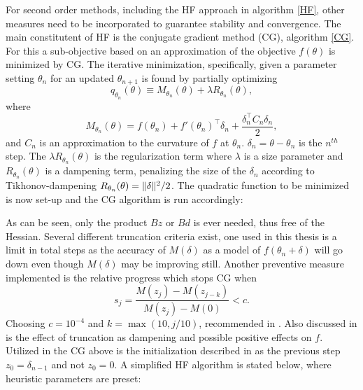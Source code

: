 For second order methods, including the HF approach in algorithm \ref{HF}, other measures need to be incorporated to guarantee stability and convergence. The main constitutent of HF is the conjugate gradient method (CG), algorithm \ref{CG}. For this a sub-objective based on an approximation of the objective $f(\theta)$ is minimized by CG. The iterative minimization, specifically, given a parameter setting $\theta_n$ for an updated $\theta_{n+1}$ is found by partially optimizing \[q_{\theta_n} (\theta) \equiv M_{\theta_n}(\theta) + \lambda R_{\theta_n}(\theta),\] where \[M_{\theta_n}(\theta) = f(\theta_n) + f'(\theta_n)^\intercal \delta_n + \frac{\delta_n^\intercal C_n \delta_n}{2},\] and $C_n$ is an approximation to the curvature of $f$ at $\theta_n$. $\delta_n = \theta - \theta_n$ is the $n^{th}$ step. The $\lambda R_{\theta_n}(\theta)$ is the regularization term where $\lambda$ is a size parameter and $R_{\theta_n}(\theta)$ is a dampening term, penalizing the size of the $\delta_n$ according to Tikhonov-dampening $R_{\theta_n}(\theta) = \lVert\delta\rVert^2/2$. The quadratic function to be minimized is now set-up and the CG algorithm is run accordingly:


As can be seen, only the product $Bz$ or $Bd$ is ever needed, thus free of the Hessian. Several different truncation criteria exist, one used in this thesis is a limit in total steps as the accuracy of $M(\delta)$ as a model of $f(\theta_n + \delta)$ will go down even though $M(\delta)$ may be improving still. Another preventive measure implemented is the relative progress which stops CG when \[s_j = \frac{M(z_j) - M(z_{j-k})}{M(z_j) - M(0)} < c.\]  Choosing $c = 10^{-4}$ and $k= \max (10, j/10)$, recommended in \cite{suts}. Also discussed in \textcite{Martens2012} is the effect of truncation as dampening and possible positive effects on $f$. Utilized in the CG above is the initialization described in \cite{Martens2012} as the previous step $z_0 = \delta_{n-1}$ and not $z_0 = 0$. A simplified HF algorithm is stated below, where heuristic parameters are preset:

